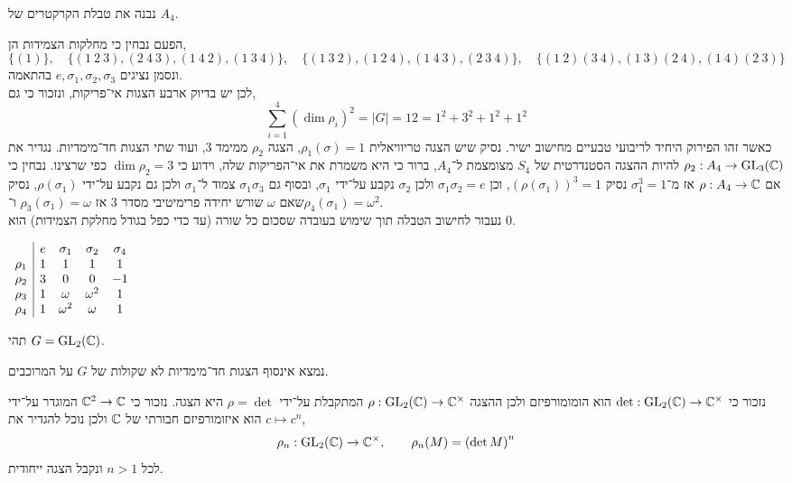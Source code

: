 \subquestion{}
נבנה את טבלת הקרקטרים של $A_4$.
\begin{solution}
	הפעם נבחין כי מחלקות הצמידות הן,
	\[
		\{ (1)\},
		\quad
		\{ (1\ 2\ 3), (2\ 4\ 3), (1\ 4\ 2), (1\ 3\ 4)\},
		\quad
		\{ (1\ 3\ 2), (1\ 2\ 4), (1\ 4\ 3), (2\ 3\ 4)\},
		\quad
		\{ (1\ 2)(3\ 4), (1\ 3)(2\ 4), (1\ 4)(2\ 3)\} 
	\]
	ונסמן נציגים $e, \sigma_1, \sigma_2, \sigma_3$ בהתאמה. \\
	לכן יש בדיוק ארבע הצגות אי־פריקות, ונזכור כי גם,
	\[
		\sum_{i = 1}^4 {(\dim \rho_i)}^2
		= |G|
		= 12
		= 1^2 + 3^2 + 1^2 + 1^2
	\]
	כאשר זהו הפירוק היחיד לריבועי טבעיים מחישוב ישיר.
	נסיק שיש הצגה טריוויאלית $\rho_1(\sigma) = 1$, הצגה $\rho_2$ ממימד $3$, ועוד שתי הצגות חד־מימדיות.
	נגדיר את $\rho_2 : A_4 \to \operatorname{GL}_3(\mathbb{C})$ להיות ההצגה הסטנדרטית של $S_4$ מצומצמת ל־$A_4$, ברור כי היא משמרת את אי־הפריקות שלה, וידוע כי $\dim \rho_2 = 3$ כפי שרצינו.
	נבחין כי אם $\rho : A_4 \to \mathbb{C}$ אז מ־$\sigma_1^3 = 1$ נסיק ${(\rho(\sigma_1))}^3 = 1$, וכן $\sigma_1 \sigma_2 = e$ ולכן $\sigma_2$ נקבע על־ידי $\sigma_1$,
	ובסוף גם $\sigma_1 \sigma_3$ צמוד ל־$\sigma_1$ ולכן גם נקבע על־ידי $\rho(\sigma_1)$, נסיק שאם $\omega$ שורש יחידה פרימיטיבי מסדר $3$ אז $\rho_3(\sigma_1) = \omega$ ו־$\rho_4(\sigma_1) = \omega^2$. \\
	נעבור לחישוב הטבלה תוך שימוש בעובדה שסכום כל שורה (עד כדי כפל בגודל מחלקת הצמידות) הוא $0$.
	\begin{otherlanguage}{english}
		\begin{center}
			$\begin{array}{c | c c c c}
				& e & \sigma_1 & \sigma_2 & \sigma_4 \\
				\rho_1 & 1 & 1 & 1 & 1 \\
				\rho_2 & 3 & 0 & 0 & -1 \\
				\rho_3 & 1 & \omega & \omega^2 & 1 \\
				\rho_4 & 1 & \omega^2 & \omega & 1
			\end{array}$
		\end{center}
	\end{otherlanguage}
\end{solution}

\question{}
תהי $G = \operatorname{GL}_2(\mathbb{C})$.

\subquestion{}
נמצא אינסוף הצגות חד־מימדיות לא שקולות של $G$ על המרוכבים.
\begin{solution}
	נזכור כי $\det : \operatorname{GL}_2(\mathbb{C}) \to \mathbb{C}^\times$ הוא הומומורפיזם ולכן ההצגה $\rho : \operatorname{GL}_2(\mathbb{C}) \to \mathbb{C}^\times$ המתקבלת על־ידי $\rho = \det$ היא הצגה.
	נזכור כי $\mathbb{C}^2 \to \mathbb{C}$ המוגדר על־ידי $c \mapsto c^n$ הוא איזומורפיזם חבורתי של $\mathbb{C}$ ולכן נוכל להגדיר את,
	\[
		\rho_n : \operatorname{GL}_2(\mathbb{C}) \to \mathbb{C}^\times,
		\qquad
		\rho_n(M) = {(\det M)}^n
	\]
	לכל $n > 1$ ונקבל הצגה ייחודית.
\end{solution}

